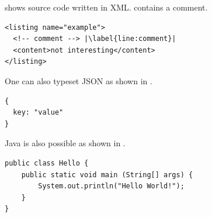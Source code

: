 \begin{ltgexample}
 shows source code written in XML\@.
 contains a comment.

\begin{listing}[htbp]
  \begin{verbatim}
<listing name="example">
  <!-- comment --> |\label{line:comment}|
  <content>not interesting</content>
</listing>
\end{verbatim}
  \caption{Example XML listing using minted}
  \label{lst:XML}
\end{listing}
\end{ltgexample}

One can also typeset JSON as shown in .

\begin{ltgexample}
\begin{listing}[htbp]
  \begin{verbatim}
{
  key: "value"
}
\end{verbatim}
  \caption{Example JSON listing using minted}
  \label{lst:flJSON}
\end{listing}
\end{ltgexample}

Java is also possible as shown in .

\begin{ltgexample}
\begin{listing}[htbp]
  \begin{verbatim}
public class Hello {
    public static void main (String[] args) {
        System.out.println("Hello World!");
    }
}
\end{verbatim}
  \caption{Java code rendered using minted}
  \label{lst:flJava}
\end{listing}
\end{ltgexample}

